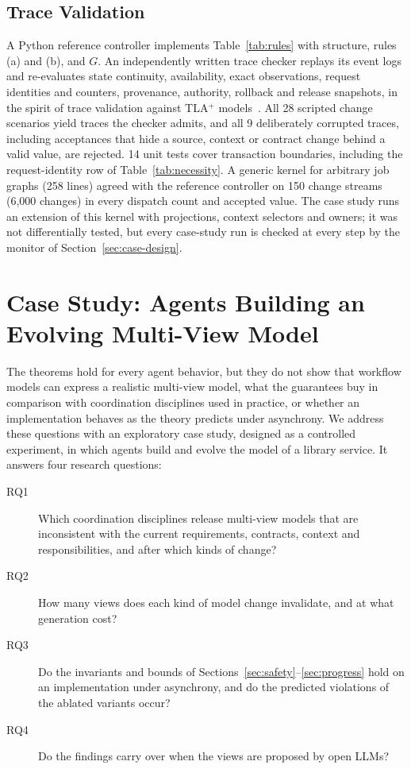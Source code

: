 \documentclass[pdflatex,sn-mathphys-num]{sn-jnl}
\theoremstyle{thmstyleone}%
\theoremstyle{thmstyletwo}%
\theoremstyle{thmstylethree}%
\newcommand{\tla}{TLA$^+$}
\newcommand{\Scenarios}{28}
\newcommand{\Corruptions}{9}
\newcommand{\RegressionTests}{14}
\newcommand{\DiffRuns}{150}
\newcommand{\DiffChanges}{6,000}
\newcommand{\GraphLines}{258}
\begin{document}
\subsection{Trace Validation}
A Python reference controller implements Table~\ref{tab:rules} with structure, rules (a) and (b), and $G$. An independently written trace checker replays its event logs and re-evaluates state continuity, availability, exact observations, request identities and counters, provenance, authority, rollback and release snapshots, in the spirit of trace validation against \tla{} models~\cite{cirstea2024trace,howard2025smartcasual}. All \Scenarios{} scripted change scenarios yield traces the checker admits, and all \Corruptions{} deliberately corrupted traces, including acceptances that hide a source, context or contract change behind a valid value, are rejected. \RegressionTests{} unit tests cover transaction boundaries, including the request-identity row of Table~\ref{tab:necessity}. A generic kernel for arbitrary job graphs (\GraphLines{} lines) agreed with the reference controller on \DiffRuns{} change streams (\DiffChanges{} changes) in every dispatch count and accepted value. The case study runs an extension of this kernel with projections, context selectors and owners; it was not differentially tested, but every case-study run is checked at every step by the monitor of Section~\ref{sec:case-design}.

\section{Case Study: Agents Building an Evolving Multi-View Model}\label{sec:case}
The theorems hold for every agent behavior, but they do not show that workflow models can express a realistic multi-view model, what the guarantees buy in comparison with coordination disciplines used in practice, or whether an implementation behaves as the theory predicts under asynchrony. We address these questions with an exploratory case study, designed as a controlled experiment, in which agents build and evolve the model of a library service. It answers four research questions:
\begin{description}
\item[RQ1] Which coordination disciplines release multi-view models that are inconsistent with the current requirements, contracts, context and responsibilities, and after which kinds of change?
\item[RQ2] How many views does each kind of model change invalidate, and at what generation cost?
\item[RQ3] Do the invariants and bounds of Sections~\ref{sec:safety}--\ref{sec:progress} hold on an implementation under asynchrony, and do the predicted violations of the ablated variants occur?
\item[RQ4] Do the findings carry over when the views are proposed by open LLMs?
\end{description}
\end{document}
